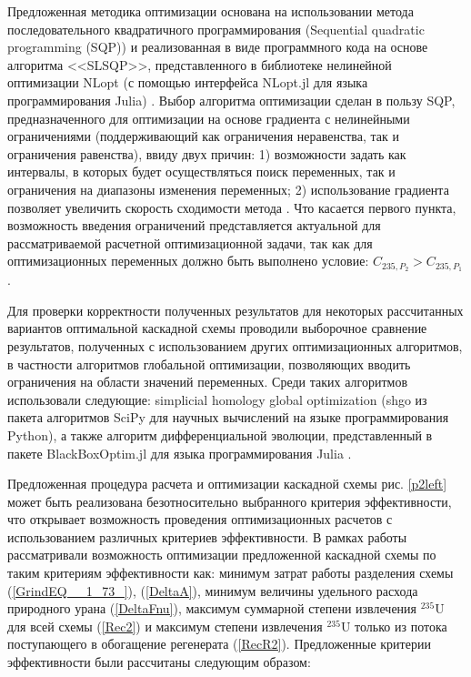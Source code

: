 Предложенная методика оптимизации основана на использовании метода последовательного квадратичного программирования (Sequential quadratic programming (SQP)) и реализованная в виде программного кода на основе алгоритма <<SLSQP>>, представленного в библиотеке нелинейной оптимизации NLopt (с помощью интерфейса NLopt.jl для языка программирования Julia) \cite{NLopt}. Выбор алгоритма оптимизации сделан в пользу SQP, предназначенного для оптимизации на основе градиента с нелинейными ограничениями (поддерживающий как ограничения неравенства, так и ограничения равенства), ввиду двух причин: 1) возможности задать как интервалы, в которых будет осуществляться поиск переменных, так и ограничения на диапазоны изменения переменных; 2) использование градиента позволяет увеличить скорость сходимости метода \cite{NumericalOptimization2006}. Что касается первого пункта, возможность введения ограничений представляется актуальной для рассматриваемой расчетной оптимизационной задачи, так как для оптимизационных переменных должно быть выполнено условие: ${C_{235,{P_2}}}>{C_{235,{P_1}}}$. 

Для проверки корректности полученных результатов для некоторых рассчитанных вариантов оптимальной каскадной схемы проводили выборочное сравнение результатов, полученных с использованием других оптимизационных алгоритмов, в частности алгоритмов глобальной оптимизации, позволяющих вводить ограничения на области значений переменных. Среди таких алгоритмов использовали следующие: simplicial homology global optimization (shgo из пакета алгоритмов SciPy для научных вычислений на языке программирования Python), а также алгоритм дифференциальной эволюции, представленный в пакете BlackBoxOptim.jl для языка программирования Julia \cite{пантелеевМетаэвристическиеАлгоритмыПоиска2009,virtanenSciPyFundamentalAlgorithms2020,endresSimplicialHomologyAlgorithm2018,mogensenOptimMathematicalOptimization2018,storn1997differential,Price-et-al-differential-evolution-2005,Feldt2018}.

Предложенная процедура расчета и оптимизации каскадной схемы рис. \ref{p2left} может быть реализована безотносительно выбранного критерия эффективности, что открывает возможность проведения оптимизационных расчетов с использованием различных критериев эффективности. В рамках работы рассматривали возможность оптимизации предложенной каскадной схемы по таким критериям эффективности как: минимум затрат работы разделения схемы (\ref{GrindEQ__1_73_}), (\ref{DeltaA}), минимум величины удельного расхода природного урана (\ref{DeltaFnu}), максимум суммарной степени извлечения $^{235}$U для всей схемы (\ref{Rec2}) и максимум степени извлечения $^{235}$U только из потока поступающего в обогащение регенерата (\ref{RecR2}). Предложенные критерии эффективности были рассчитаны следующим образом:

